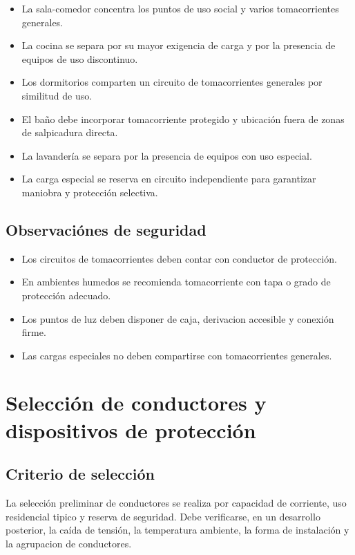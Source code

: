 \begin{itemize}
  \item La sala-comedor concentra los puntos de uso social y varios tomacorrientes generales.
  \item La cocina se separa por su mayor exigencia de carga y por la presencia de equipos de uso discontinuo.
  \item Los dormitorios comparten un circuito de tomacorrientes generales por similitud de uso.
  \item El baño debe incorporar tomacorriente protegido y ubicación fuera de zonas de salpicadura directa.
  \item La lavandería se separa por la presencia de equipos con uso especial.
  \item La carga especial se reserva en circuito independiente para garantizar maniobra y protección selectiva.
\end{itemize}

\subsection{Observaciónes de seguridad}

\begin{itemize}
  \item Los circuitos de tomacorrientes deben contar con conductor de protección.
  \item En ambientes humedos se recomienda tomacorriente con tapa o grado de protección adecuado.
  \item Los puntos de luz deben disponer de caja, derivacion accesible y conexión firme.
  \item Las cargas especiales no deben compartirse con tomacorrientes generales.
\end{itemize}

\section{Selección de conductores y dispositivos de protección}

\subsection{Criterio de selección}

La selección preliminar de conductores se realiza por capacidad de corriente, uso residencial tipico y reserva de seguridad. Debe verificarse, en un desarrollo posterior, la caída de tensión, la temperatura ambiente, la forma de instalación y la agrupacion de conductores.

